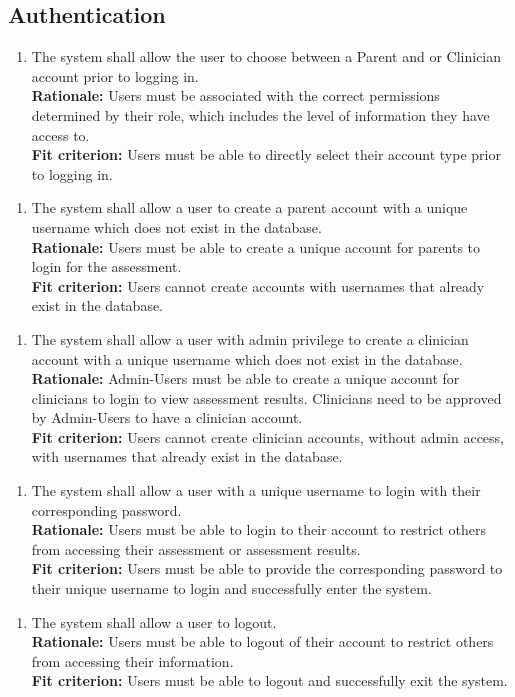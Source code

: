 \documentclass[12pt]{article}
\begin{document}
\subsection{Authentication}
\begin{enumerate}[{FR-A}1. ]
  \item The system shall allow the user to choose between a Parent and  or Clinician account prior to logging in.\\
  \textbf{Rationale: }Users must be associated with the correct permissions determined by their role, which includes the level of information they have access to.\\
  \textbf{Fit criterion: }Users must be able to directly select their account type prior to logging in. 
\end{enumerate}
\begin{enumerate}[{FR-A}2. ]
  \item The system shall allow a user to create a parent account with a unique username which does not exist in the database.\\
  \textbf{Rationale: }Users must be able to create a unique account for parents to login for the assessment.\\
  \textbf{Fit criterion: }Users cannot create accounts with usernames that already exist in the database.
\end{enumerate}
\begin{enumerate}[{FR-A}3. ]
  \item The system shall allow a user with admin privilege to create a clinician account with a unique username which does not exist in the database.\\
  \textbf{Rationale: }Admin-Users must be able to create a unique account for clinicians to login to view assessment results. Clinicians need to be approved by Admin-Users to have a clinician account.\\
  \textbf{Fit criterion: }Users cannot create clinician accounts, without admin access, with usernames that already exist in the database. 
\end{enumerate}
\begin{enumerate}[{FR-A}4. ]
  \item The system shall allow a user with a unique username to login with their corresponding password.\\
  \textbf{Rationale: }Users must be able to login to their account to restrict others from accessing their assessment or assessment results.\\
  \textbf{Fit criterion: }Users must be able to provide the corresponding password to their unique username to login and successfully enter the system. 
\end{enumerate}
\begin{enumerate}[{FR-A}5. ]
  \item The system shall allow a user to logout.\\
  \textbf{Rationale: }Users must be able to logout of their account to restrict others from accessing their information.\\
  \textbf{Fit criterion: }Users must be able to logout and successfully exit the system.
\end{enumerate}
\end{document}
